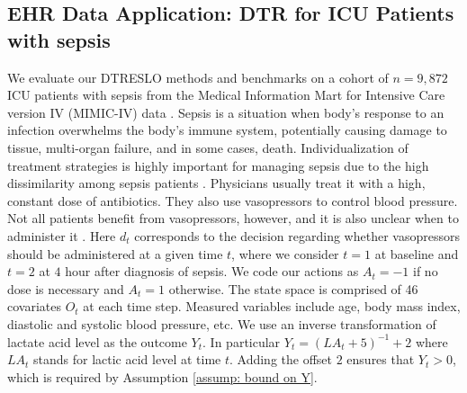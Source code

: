 \documentclass[preprint] {imsart}
\begin{document}

\subsection{EHR Data Application: DTR for ICU Patients with sepsis}
\label{sec: application}

We evaluate our DTRESLO methods and benchmarks on a cohort of $n=9,872$ ICU patients with sepsis from the Medical Information Mart for Intensive Care version IV (MIMIC-IV)  data \citep{mimicIV}. Sepsis is a situation when body's response to an infection  overwhelms the body's immune system, potentially causing damage to tissue, multi-organ failure, and in some cases, death. Individualization of treatment strategies is highly important for managing sepsis due to the high dissimilarity among sepsis patients \citep{lat2021,Komorowski,SonabendESRL}. Physicians usually treat it with a high, constant dose of antibiotics. They also use vasopressors to control blood pressure. Not all patients benefit from vasopressors, however, and it is also unclear when to administer it \citep{lat2021}. Here $d_t$ corresponds to the decision regarding whether  vasopressors should be administered at a given time $t$, where we consider $t=1$ at baseline and $t=2$ at $4$ hour after diagnosis of sepsis. We code our actions as $A_t=-1$ if no dose is necessary and $A_t=1$ otherwise. The state space is comprised of 46 covariates $O_t$ at each time step. Measured variables include age, body mass index, diastolic and systolic blood pressure, etc. We use an inverse transformation of lactate acid level as the outcome $Y_t$. In particular $Y_t=(LA_t+5)^{-1}+2$ where $LA_t$ stands for lactic acid level at time $t$. Adding the offset $2$ ensures that $Y_t>0$, which is required by Assumption \ref{assump: bound on Y}. 
\end{document}
